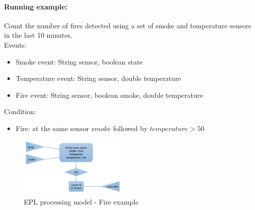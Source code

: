 \documentclass[10pt,a4paper]{article}
\begin{document}
\paragraph{Running example:}
Count the number of fires detected using a set of smoke and temperature sensors in the last 10 minutes. \\
Events:
\begin{itemize}
	\item Smoke event: String sensor, boolean state
	\item Temperature event: String sensor, double temperature
	\item Fire event: String sensor, boolean smoke, double temperature
\end{itemize}
Condition:
\begin{itemize}
	\item Fire: at the same sensor $smoke$ followed by $temperature > 50$
\end{itemize}
\begin{figure}[ht!]
 \hfill \includegraphics[width=150pt]{images/epl-processing-model-ex.png}\hspace*{\fill}
 \caption{EPL processing model - Fire example}
\end{figure} 
\end{document}
